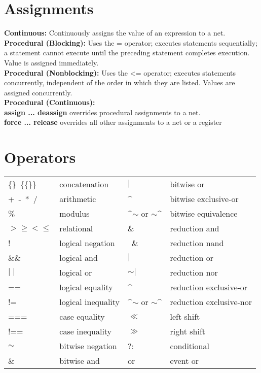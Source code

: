 \documentclass[10pt,twocolumn]{article}
\begin{document}
\section*{Assignments}\vspace{-10pt}
\textbf{Continuous:} Continuously assigns the value of an expression to a net.\\
\textbf{Procedural (Blocking):} Uses the = operator; executes statements sequentially; a statement cannot execute until the preceding statement completes execution. Value is assigned immediately.\\
\textbf{Procedural (Nonblocking):} Uses the <= operator; executes statements concurrently, independent of the order in which they are listed. Values are assigned concurrently.\\
\textbf{Procedural (Continuous):} \\
\textbf{assign ... deassign} overrides procedural assignments to a net. \\
\textbf{force ... release} overrides all other assignments to a net or a register
%
\section*{Operators}\vspace{-10pt}
\begin{center}
\begin{tabular}{ll|ll}
\{\}~\{\{\}\}   & concatenation      & $\mid$                   & bitwise or \\
+~-~*~/         & arithmetic         & \^{}                     & bitwise exclusive-or \\
\%              & modulus            & \^{}$\sim$ or $\sim$\^{} & bitwise equivalence \\
$> \geq < \leq$ & relational         & \&                       & reduction and \\
!               & logical negation   & ~\&                      & reduction nand \\
\&\&            & logical and        & $\mid$                   & reduction or \\
$\mid\mid$      & logical or         & $\sim\mid$               & reduction nor \\
==              & logical equality   & \^{}                     & reduction exclusive-or \\
!=              & logical inequality & \^{}$\sim$ or $\sim$\^{} & reduction exclusive-nor \\
===             & case equality      & $\ll$                    & left shift \\
!==             & case inequality    & $\gg$                    & right shift \\
$\sim$          & bitwise negation   & ?:                       & conditional \\
\&              & bitwise and        & or                       & event or
\end{tabular}
\end{center}
%
\end{document}
